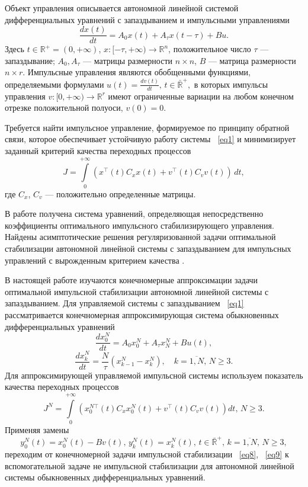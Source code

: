Объект управления описывается автономной
линейной системой дифференциальных уравнений с запаздыванием и импульсными управлениями
\begin{equation}\label{eq1}
\frac{dx(t)}{dt}=A_{0}x(t)+A_{\tau}x(t-\tau)+Bu.
\end{equation}
Здесь $t\in\mathbb{R}^{+}=(0,+\infty)$,  $x:[-\tau,+\infty)\rightarrow\mathbb{R}^{n}$, положительное число $\tau$ --- запаздывание; $A_{0}, A_{\tau}$ --- матрицы размерности $n\times n$, $B$ --- матрица размерности $n\times r$. Импульсные управления являются обобщенными функциями, определяемыми формулами  $u(t)=\frac{dv(t)}{dt},\,t\in \bar{\mathbb{R}}^{+},$ в которых импульсы управления $v: [0, +\infty)\rightarrow\mathbb{R}^{r}$ имеют ограниченные вариации на любом конечном отрезке положительной полуоси,  $v(0)=0$.

Требуется найти импульсное управление, формируемое по принципу  обратной связи, которое обеспечивает устойчивую работу системы
~\eqref{eq1}  и минимизирует заданный критерий качества переходных процессов
\begin{equation}\label{eq2}
 J=\int\limits_{0}^{+\infty}\left( x^{\top}(t)C_{x}x(t)+v^{\top}(t)C_{v}v(t)\right)\,dt,
\end{equation}
где  $C_{x}$, $C_{v}$  --- положительно определенные матрицы.

В работе \cite{1} получена система уравнений, определяющая непосредственно коэффициенты оптимального импульсного стабилизирующего управления. Найдены асимптотические решения регуляризованной задачи оптимальной стабилизации автономной линейной системы с запаздыванием для  импульсных управлений с вырожденным критерием качества \cite{2}. 

 В настоящей работе  изучаются конечномерные аппроксимации задачи оптимальной импульсной стабилизации автономной линейной системы с запаздыванием. Для управляемой системы с запаздыванием ~\eqref{eq1} рассматривается конечномерная аппроксимирующая система обыкновенных дифференциальных уравнений
\begin{equation}\label{eq8}
\frac{dx_{0}^{N}}{dt}=A_{0}x_{0}^{N}+A_{\tau}x_{N}^{N}+Bu(t),
\end{equation}
\begin{equation*}
\frac{dx_{k}^{N}}{dt}=\frac{N}{\tau}\left(x_{k-1}^{N}-x_{k}^{N}\right),\quad k=\overline{1,N},\,N\geq 3.
\end{equation*}
Для аппроксимирующей управляемой импульсной системы используем показатель качества переходных процессов
\begin{equation}\label{eq9}
 J^{N}=\int\limits_{0}^{+\infty}\left( x_{0}^{N\top}(t)C_{x}x_{0}^{N}(t)+v^{\top}(t)C_{v}v(t)\right)dt,\,N\geq 3.
\end{equation}
Применяя замены
\begin{equation*}
y_{0}^{N}(t)=x_{0}^{N}(t)-Bv(t),\,y_{k}^{N}(t)=x_{k}^{N}(t),\,t\in \mathbb{\bar{R}}^{+},\,k=\overline{1,N},\,N\geq 3,
\end{equation*}
переходим от конечномерной задачи импульсной стабилизации  ~\eqref{eq8}, ~\eqref{eq9}  к вспомогательной задаче  не импульсной стабилизации для автономной линейной системы обыкновенных дифференциальных уравнений.

